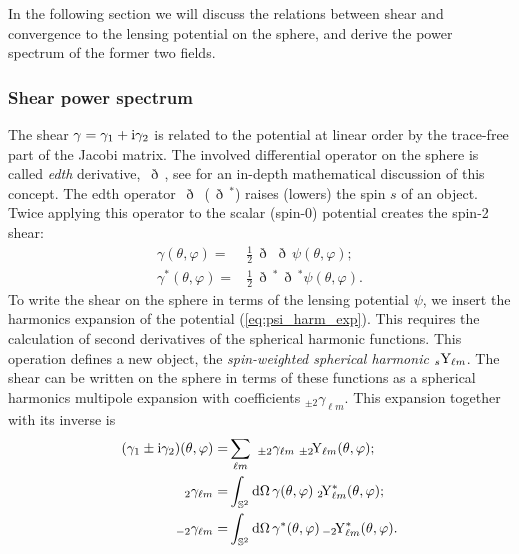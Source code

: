 \documentclass[fleqn,usenatbib]{mnras} %
\newcommand{\edth}{\,\eth\,}
\begin{document}
In the following section we will discuss the relations between shear and
convergence to the lensing potential on the sphere, and derive the power
spectrum of the former two fields.

\subsubsection{Shear power spectrum}

The shear $\gamma = \gamma_1 + {\rm i} \gamma_2$ is related to the potential at
linear order by the trace-free part of the Jacobi matrix. The involved
differential operator on the sphere is called \emph{edth} derivative, $\edth$,
see \cite{2005PhRvD..72b3516C} for an in-depth mathematical discussion of this
concept. The edth operator $\edth$ ($\edth^\ast$) raises (lowers) the spin $s$
of an object. Twice applying this operator to the scalar (spin-0) potential
creates the spin-2 shear:
%
\begin{align}
  \gamma(\theta, \varphi) = & \frac 1 2 \edth \edth \psi(\theta, \varphi);
    \nonumber \\
  \gamma^\ast(\theta, \varphi) = & \frac 1 2 \edth^\ast \edth^\ast \psi(\theta, \varphi).
  \label{gamma_psi_spher}
\end{align}
%
To write the shear on the sphere in terms of the lensing potential $\psi$, we
insert the harmonics expansion of the potential (\ref{eq:psi_harm_exp}). This
requires the calculation of second derivatives of the spherical harmonic functions.
This operation defines a new object, the \emph{spin-weighted spherical
harmonic} $_s{\rm Y}_{\ell m}$. The shear can be written on the sphere in terms
of these functions as a spherical harmonics multipole expansion with
coefficients $_{\pm 2} \gamma_{\ell m}$. This expansion together with its inverse
is
%
%
\begin{align}
  (\gamma_1 \pm {\rm i} \gamma_2)(\theta, \varphi) = & \sum_{\ell m} \,\, _{\pm 2}\gamma_{\ell m} \; _{\pm 2}\!{\rm Y}_{\ell m}(\theta, \varphi);
  \label{eq:gamma_harm_exp}
    \\
  \, _2 \gamma_{\ell m} = & \int_{\mathbb{S}^2} {\rm d} \Omega \, \gamma(\theta, \varphi) \;  _2\!{\rm Y}^\ast_{\ell m}(\theta, \varphi);
    \nonumber \\
  \, _{-2} \gamma_{\ell m} = & \int_{\mathbb{S}^2} {\rm d} \Omega \, \gamma^\ast(\theta, \varphi) \,  _{-2}\!{\rm Y}^\ast_{\ell m}(\theta, \varphi).
  \label{eq:gamma_harm_exp_inv}
\end{align}
\end{document}
